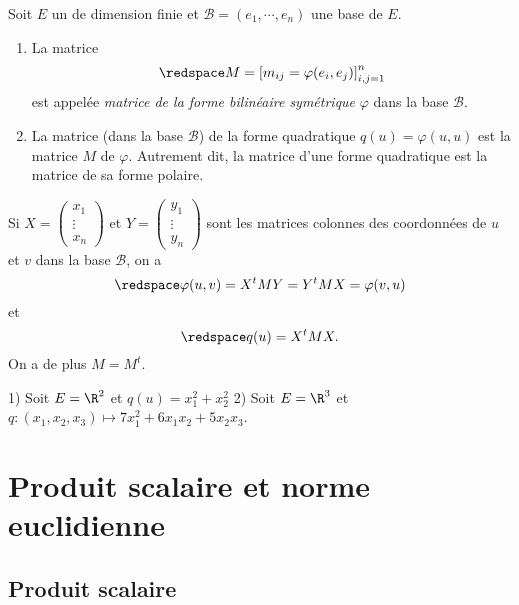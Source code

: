 \begin{definition}
	Soit $E$ un \rev{} de dimension finie et $\mathcal B = (e_1,\cdots,e_n)$ une base de $E$. 
	\begin{enumerate}[label=$(\roman*)$]
		\item La matrice 
			\[\redspace 
				M = \left[ m_{ij}= \varphi(e_i,e_j) \right]_{i,j=1}^n
			\] 
			est appelée \emph{matrice de la forme bilinéaire symétrique} $\varphi$ dans la base $\mathcal B$.
		\item	La matrice (dans la base $\mathcal B$) de la forme quadratique $q(u) = \varphi(u,u)$ est la matrice $M$ de $\varphi$. Autrement dit, la matrice d'une forme quadratique est la matrice de sa forme polaire.
	\end{enumerate}
\end{definition}

Si $X = \begin{pmatrix}
	x_1\\\vdots\\x_n
\end{pmatrix}$ et $Y = \begin{pmatrix}
	y_1\\\vdots\\y_n
\end{pmatrix}$  sont les matrices colonnes des coordonnées de $u$ et $v$ dans la base $\mathcal B$, on a 
\[\redspace
	\varphi(u,v) = X^t M Y = Y^t M X = \varphi(v,u)
\]
et
\[\redspace
q(u) = X^t M X.
\]
On a de plus $M = M^t$.
\begin{exemple}
1) Soit $E=\R^2$ et $q(u) = x_1^2 + x_2^2$
	\pl{\rep{2cm}} %
2) Soit $E=\R^3$ et  $q:(x_1,x_2,x_3) \mapsto 7x_1^2 + 6 x_1x_2 +  5  x_2 x_3$.

\pl{\rep{4cm}} %
\end{exemple}


\sld{\vfill\pagebreak[5]}%

\section{Produit scalaire et norme euclidienne}



\subsection{Produit scalaire}

